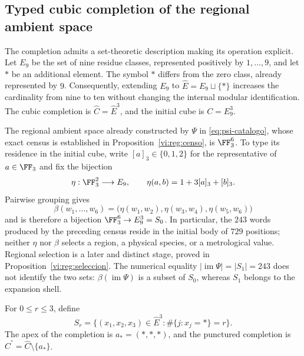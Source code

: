 \subsection{Typed cubic completion of the regional ambient space}
\label{vi:cubo:completacion}

The completion admits a set-theoretic description making its operation
explicit. Let \(E_9\) be the set of nine residue classes, represented
positively by \(1,\ldots,9\), and let \(\ast\) be an additional element.
The symbol \(\ast\) differs from the zero class, already represented by \(9\).
Consequently, extending \(E_9\) to
\(\widehat E=E_9\sqcup\{\ast\}\) increases the cardinality from nine
to ten without changing the internal modular identification. The cubic
completion is \(\widehat C=\widehat E^3\), and the initial cube is \(C=E_9^3\).

The regional ambient space already constructed by \(\Psi\) in
\eqref{eq:psi-catalogo}, whose exact census is established in
Proposition~\ref{vi:reg:censo}, is \(\FF_3^6\). To type its residence in
the initial cube, write
\([a]_3\in\{0,1,2\}\) for the representative of \(a\in\FF_3\) and fix
the bijection
\[
 \eta:\FF_3^2\longrightarrow E_9,
 \qquad \eta(a,b)=1+3[a]_3+[b]_3.
\]
Pairwise grouping gives
\begin{equation}
 \beta(w_1,\ldots,w_6)=
 \bigl(\eta(w_1,w_2),\eta(w_3,w_4),\eta(w_5,w_6)\bigr)
 \label{vi:cubo:beta}
\end{equation}
and is therefore a bijection \(\FF_3^6\to E_9^3=S_0\). In particular,
the \(243\) words produced by the preceding census reside in the initial
body of \(729\) positions; neither \(\eta\) nor \(\beta\) selects a
region, a physical species, or a metrological value. Regional selection
is a later and distinct stage, proved in
Proposition~\ref{vi:reg:seleccion}. The numerical equality
\(|\operatorname{im}\Psi|=|S_1|=243\) does not identify the two sets:
\(\beta(\operatorname{im}\Psi)\) is a subset of \(S_0\), whereas
\(S_1\) belongs to the expansion shell.



\begin{definition}
For \(0\leq r\leq3\), define
\[
 S_r=\{(x_1,x_2,x_3)\in\widehat E^3:
             \#\{j:x_j=\ast\}=r\}.
\]
The apex of the completion is \(a_\ast=(\ast,\ast,\ast)\), and the
punctured completion is \(\widehat C^{\circ}=\widehat C\setminus\{a_\ast\}\).
\end{definition}

